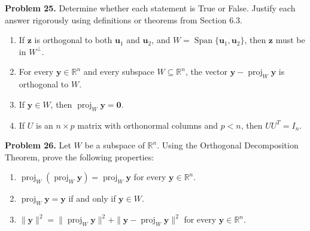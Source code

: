 \documentclass[11pt, letterpaper]{article}
\theoremstyle{definition}
\theoremstyle{remark}
\newcommand{\R}{\mathbb{R}}
\begin{document}
\textbf{Problem 25.} Determine whether each statement is True or False. Justify each answer rigorously using definitions or theorems from Section 6.3.
\begin{enumerate}[label=(\alph*)]
    \item If $\mathbf{z}$ is orthogonal to both $\mathbf{u}_1$ and $\mathbf{u}_2$, and $W = \operatorname{Span}\{\mathbf{u}_1, \mathbf{u}_2\}$, then $\mathbf{z}$ must be in $W^\perp$.
    \item For every $\mathbf{y} \in \R^n$ and every subspace $W \subseteq \R^n$, the vector $\mathbf{y} - \operatorname{proj}_W \mathbf{y}$ is orthogonal to $W$.
    \item If $\mathbf{y} \in W$, then $\operatorname{proj}_W \mathbf{y} = \mathbf{0}$.
    \item If $U$ is an $n \times p$ matrix with orthonormal columns and $p < n$, then $UU^T = I_n$.
\end{enumerate}

\textbf{Problem 26.} Let $W$ be a subspace of $\R^n$. Using the Orthogonal Decomposition Theorem, prove the following properties:
\begin{enumerate}[label=(\alph*)]
    \item $\operatorname{proj}_W(\operatorname{proj}_W \mathbf{y}) = \operatorname{proj}_W \mathbf{y}$ for every $\mathbf{y} \in \R^n$.
    \item $\operatorname{proj}_W \mathbf{y} = \mathbf{y}$ if and only if $\mathbf{y} \in W$.
    \item $\|\mathbf{y}\|^2 = \|\operatorname{proj}_W \mathbf{y}\|^2 + \|\mathbf{y} - \operatorname{proj}_W \mathbf{y}\|^2$ for every $\mathbf{y} \in \R^n$.
\end{enumerate}
\end{document}
